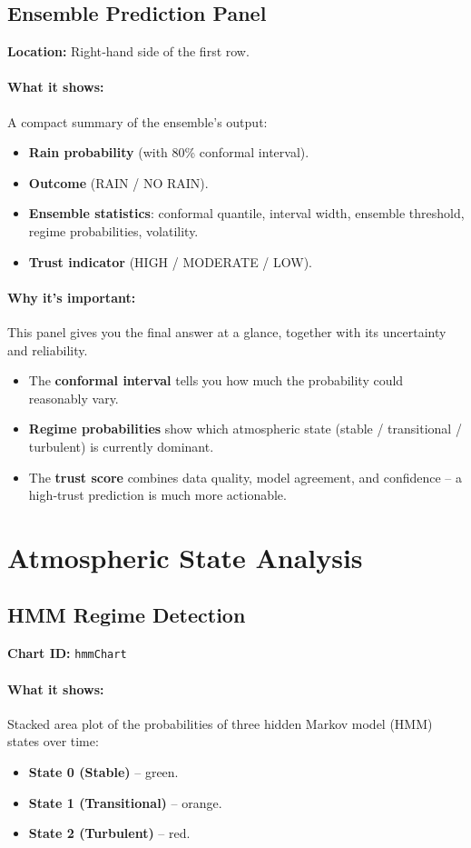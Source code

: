 \documentclass[11pt,a4paper]{article}
\begin{document}
	\subsection{Ensemble Prediction Panel}
	\textbf{Location:} Right‑hand side of the first row.
	
	\paragraph{What it shows:}
	A compact summary of the ensemble’s output:
	\begin{itemize}
		\item \textbf{Rain probability} (with 80\% conformal interval).
		\item \textbf{Outcome} (RAIN / NO RAIN).
		\item \textbf{Ensemble statistics}: conformal quantile, interval width, ensemble threshold, regime probabilities, volatility.
		\item \textbf{Trust indicator} (HIGH / MODERATE / LOW).
	\end{itemize}
	
	\paragraph{Why it’s important:}
	This panel gives you the final answer at a glance, together with its uncertainty and reliability.
	\begin{itemize}
		\item The \textbf{conformal interval} tells you how much the probability could reasonably vary.
		\item \textbf{Regime probabilities} show which atmospheric state (stable / transitional / turbulent) is currently dominant.
		\item The \textbf{trust score} combines data quality, model agreement, and confidence – a high‑trust prediction is much more actionable.
	\end{itemize}
	
	\section{Atmospheric State Analysis}
	
	\subsection{HMM Regime Detection}
	\textbf{Chart ID:} \texttt{hmmChart}
	
	\paragraph{What it shows:}
	Stacked area plot of the probabilities of three hidden Markov model (HMM) states over time:
	\begin{itemize}
		\item \textbf{State 0 (Stable)} – green.
		\item \textbf{State 1 (Transitional)} – orange.
		\item \textbf{State 2 (Turbulent)} – red.
	\end{itemize}
	
\end{document}
